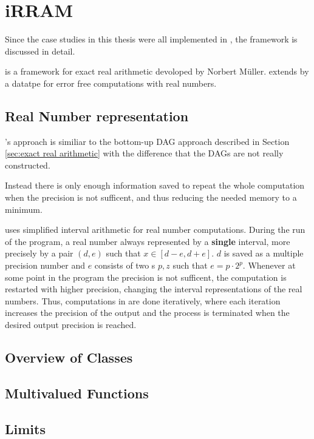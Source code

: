 \section{iRRAM}
	Since the case studies in this thesis were all implemented  in \irram, the \irram framework 
	is discussed in detail.

	\irram is a \cc framework for exact real arithmetic devoloped by Norbert M\"uller.
	\irram extends \cc by a datatpe \real for error free computations with real numbers.
	\subsection{Real Number representation}
		\irram's approach is similiar to the bottom-up DAG approach described in Section \ref{sec:exact real arithmetic}
		with the difference that the DAGs are not really constructed.

		Instead there is only enough information saved to repeat the whole computation when the precision is not sufficent, and thus reducing the needed memory to a minimum.

		\irram uses simplified interval arithmetic for real number computations.
		During the run of the program, a real number always represented by a \textbf{single} interval, more precisely by a pair $(d,e)$ such that $x \in [d-e, d+e]$.
 		$d$ is saved as a multiple precision number and $e$ consists of two s $p,z$ such that $e = p \cdot 2^p$.
 		Whenever at some point in the program the precision is not sufficent, the computation is restarted with higher precision, 
 		changing the interval representations of the real numbers.
 		Thus, computations in \irram are done iteratively, where each iteration increases the precision of the output and the process is terminated when the desired output precision is reached. 
	\subsection{Overview of Classes}
		
	\subsection{Multivalued Functions}
	\subsection{Limits}

